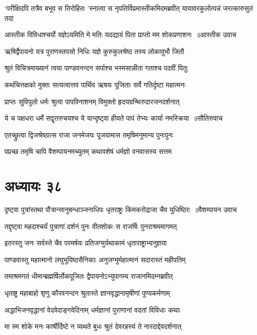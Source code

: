 \threelineshloka
{`परीक्षिदपि तत्रैव बभूव स तिरोहितः}
{'स्नात्वा स नृपतिर्विप्रमास्तीकमिदमब्रवीत्}
{यायावरकुलोत्पन्नं जरत्कारुसुतं तदा}


\threelineshloka
{आस्तीक विविधाश्चर्यो यज्ञेऽयमिति मे मतिः}
{यदद्यायं पिता प्राप्तो मम शोकप्रणाशनः ॥आस्तीक उवाच}
{}


\twolineshloka
{ऋषिर्द्वैपायनो यत्र पुराणस्तपसो निधिः}
{यज्ञे कुरुकुलश्रेष्ठ तस्य लोकावुभौ जितौ}


\twolineshloka
{श्रुतं विचित्रमाख्यानं त्वया पाण्डवनन्दन}
{सर्पाश्च भस्मसान्नीता गताश्च पदवीं पितुः}


\twolineshloka
{कथंचित्तक्षको मुक्तः सत्यत्वात्तव पार्थिव}
{ऋषयः पूजिताः सर्वे गतिर्दृष्टा महात्मनः}


\twolineshloka
{प्राप्तः सुविपुलो धर्मः श्रुत्वा पापविनाशनम्}
{विमुक्तो हृदयग्रन्थिरुदारजनदर्शनात्}


\threelineshloka
{ये च पक्षधरा धर्मे सद्वृत्तरुचयश्च ये}
{यान्दृष्ट्वा हीयते पापं तेभ्यः कार्या नमस्क्रिया ॥सौतिरुवाच}
{}


\twolineshloka
{एतच्छ्रुत्वा द्विजश्रेष्ठात्स राजा जनमेजयः}
{पूजयामास तमृषिमनुमान्य पुनःपुनः}


\twolineshloka
{पप्रच्छ तमृषि चापि वैशम्पायनमच्युतम्}
{कथावशेषं धर्मज्ञो वनवासस्य सत्तम}


\chapter{अध्यायः ३८}
\threelineshloka
{दृष्ट्वा पुत्रांस्तथा पौत्रान्सानुबन्धाञ्जनाधिपः}
{धृतराष्ट्रः किमकरोद्राजा चैव युधिष्ठिरः ॥वैशम्पायन उवाच}
{}


\twolineshloka
{तद्दृष्ट्वा महदाश्चर्यं पुत्राणां दर्शनं पुनः}
{वीतशोकः स राजर्षिः पुनराश्रममागमत्}


\twolineshloka
{इतरस्तु जनः सर्वस्ते चैव परमर्षयः}
{प्रतिजग्मुर्यथाकामं धृताराष्ट्राभ्यनुज्ञया}


\twolineshloka
{पाण्डवास्तु महात्मानो लघुभूयिष्ठसैनिकाः}
{अनुजग्मुर्महात्मानं सदारास्तं महीपतिम्}


\twolineshloka
{तमाश्रमगतं धीमान्ब्रह्मर्षिर्लोकपूजितः}
{द्वैपायनोऽभ्युपागम्य राजानमिदम्नब्रवीत्}


\twolineshloka
{धृताष्ट्र महाबाहो शृणु कौरवनन्दन}
{श्रुतास्ते ज्ञानवृद्धानामृषीणां पुण्यकर्मणाम्}


\twolineshloka
{अद्धाभिजनवृद्धानां वेदवेदाङ्गवेदिनाम्}
{धर्मज्ञानां पुराणानां वदतां विविधाः कथाः}


\twolineshloka
{मा स्म शोके मनः कार्षीर्दिष्टे न व्यथते बुधः}
{श्रुतं देवरहस्यं ते नारदाद्देवदर्शनात्}


